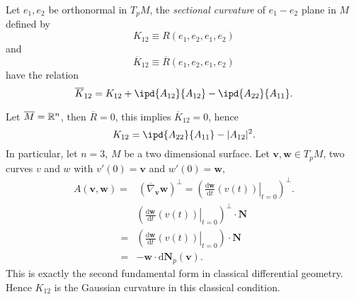 \begin{corollary}
  Let $e_1,e_2$ be orthonormal in $T_pM$, the \textit{sectional curvature} of $e_1-e_2$ plane in $M$ defined by 
  \[
    K_{12}\equiv R\left( e_1,e_2,e_1,e_2 \right) 
  \] 
  and 
  \[
    \overline{K}_{12}\equiv \overline{R}\left( e_1,e_2,e_1,e_2 \right) 
  \] 
  have the relation
  \begin{equation}
    \overline{K}_{12}=K_{12}+\ipd{A_{12}}{A_{12}}-\ipd{A_{22}}{A_{11}}.
  \end{equation}
\end{corollary}
\begin{example}
  Let $\overline{M}=\mathbb{R}^{n}$, then $\overline{R}=0$, this implies $\overline{K}_{12}=0$, hence
  \[
  K_{12}=\ipd{A_{22}}{A_{11}}-|A_{12}|^2.
  \]
  In particular, let $n=3$, $M$ be a two dimensional surface. Let $\mathbf{v},\mathbf{w}\in T_pM$, two curves $v$ and $w$ with  $v'(0)=\mathbf{v}$ and $w'(0)=\mathbf{w}$, 
  \begin{align*}
    A\left( \mathbf{v},\mathbf{w} \right) =&(\overline{\nabla} _{\mathbf{v}}\mathbf{w})^{\perp}=\left( \left.\frac{\mathrm{d}\mathbf{w}}{\mathrm{d}t}\left( v(t) \right) \right|_{t=0}\right)^\perp
  .\end{align*}
  \begin{align*} 
    &\left( \left.\frac{\mathrm{d}\mathbf{w}}{\mathrm{d}t}\left( v(t) \right) \right|_{t=0}\right)^\perp \cdot \mathbf{N}\\
     = &\left( \left.\frac{\mathrm{d}\mathbf{w}}{\mathrm{d}t}\left( v(t) \right) \right|_{t=0}\right) \cdot \mathbf{N}\\
       =& - \mathbf{w}\cdot \mathrm{d}\mathbf{N}_p\left( \mathbf{v} \right) 
  .\end{align*}
  This is exactly the second fundamental form in classical differential geometry. Hence $K_{12}$ is the Gaussian curvature in this classical condition.
\end{example}

